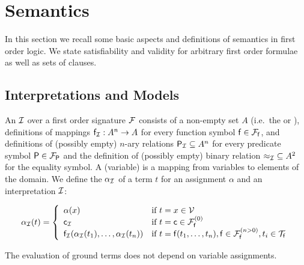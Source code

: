 







\section{Semantics}\label{sec:first:order:semantics}

In this section we recall some basic aspects and definitions of semantics in first order logic.
We state satisfiability and validity 
for arbitrary first order formulae as well as sets of clauses.

\subsection{Interpretations and Models}

\begin{definition}\label{def:interpretation}
	An  \( \mcI \)
	over a first order signature \( \mcF \) consists of a
	non-empty set \( A \)
	(i.e.\ the  or ),
%
	definitions of mappings
	\( \mf_\mcI: A^n\rightarrow A \)
	for every function symbol \( \mf\in\mcFf \),
	and definitions of (possibly empty) \(n\)-ary relations
	 \( {\mP_\mcI}\subseteq A^n \) for every predicate symbol \( \mP\in\mcFP \)
	 and the definition of (possibly empty) binary relation \( {\mEQ_\mcI}\subseteq A^2 \) for the equality symbol.
%
	 A (variable)  is a mapping from variables to elements of the domain.
%
	 We define the  \( \alpha_\mcI \) of a term \( t \)
	 for an assignment \( \alpha \) and an interpretation \( \mcI \):

	 \begin{gather*}
	 \MDEFINE{\alpha_\mcI(t)
	 }{ll}{
	 	\alpha(x)
	 	&\text{if }t=x\in\mcV \\
	 	\mc_\mcI
	 	&\text{if }t=\mc\in\mcFfn[0]
	 	\\
	 	\mf_\mcI (\alpha_\mcI(t_1),\ldots,\alpha_\mcI(t_n))
	 	&\text{if }t=\mf(t_1,\ldots,t_n), \mf\in\mcFfn[n>0], t_i\in\mcTf
 }
	 \end{gather*}

\end{definition}

\begin{remark}
	The evaluation of ground terms does not depend on variable assignments.
\end{remark}

